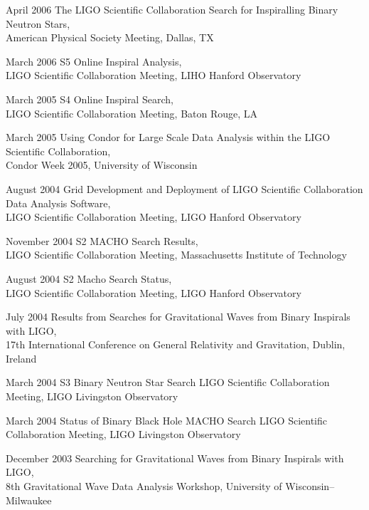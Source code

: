 \documentclass{cv}
\begin{document}
\begin{entry}
\item[April 2006] {The LIGO Scientific Collaboration Search for Inspiralling Binary Neutron Stars},\\
{\small American Physical Society Meeting, Dallas, TX}

\item[March 2006] {S5 Online Inspiral Analysis},\\
{\small LIGO Scientific Collaboration Meeting, LIHO Hanford Observatory}

\item[March 2005] {S4 Online Inspiral Search},\\
{\small LIGO Scientific Collaboration Meeting, Baton Rouge, LA}

\item[March 2005] {Using Condor for Large Scale Data Analysis within the LIGO Scientific Collaboration},\\
{\small Condor Week 2005, University of Wisconsin}

\item [August 2004] {Grid Development and Deployment of LIGO Scientific Collaboration Data Analysis Software},\\
{\small LIGO Scientific Collaboration Meeting, LIGO Hanford Observatory}

\item [November 2004] {S2 MACHO Search Results},\\
{\small LIGO Scientific Collaboration Meeting, Massachusetts Institute of Technology}

\item [August 2004] {S2 Macho Search Status},\\
{\small LIGO Scientific Collaboration Meeting, LIGO Hanford Observatory}

\item[July 2004] {Results from Searches for Gravitational Waves from Binary Inspirals with LIGO},\\
{\small 17th International Conference on General Relativity and Gravitation,
Dublin, Ireland}

\item[March 2004]{ S3 Binary Neutron Star Search}
{\small LIGO Scientific Collaboration Meeting, LIGO Livingston Observatory}

\item[March 2004]{Status of Binary Black Hole MACHO Search}
{\small LIGO Scientific Collaboration Meeting, LIGO Livingston Observatory}

\item[December 2003] {Searching for Gravitational Waves from Binary Inspirals with LIGO},\\
{\small 8th Gravitational Wave Data Analysis Workshop, University of
Wisconsin--Milwaukee}


\end{entry}
\end{document}
